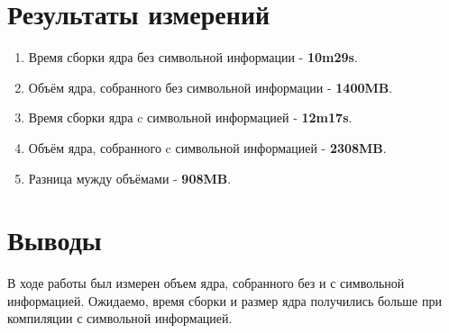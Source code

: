 \documentclass[a4paper,11pt]{article}
\begin{document}
\section{Результаты измерений}
  \begin{enumerate}
    \item Время сборки ядра без символьной информации - \textbf{10m29s}.
    \item Объём ядра, собранного без символьной информации - \textbf{1400MB}.
    \item Время сборки ядра c символьной информацией - \textbf{12m17s}.
    \item Объём ядра, собранного c символьной информацией - \textbf{2308MB}.
    \item Разница мужду объёмами - \textbf{908MB}.
  \end{enumerate}

\section{Выводы}
  В ходе работы был измерен объем ядра, собранного без и с символьной информацией.
  Ожидаемо, время сборки и размер ядра получились больше при компиляции с символьной информацией.
\end{document}
